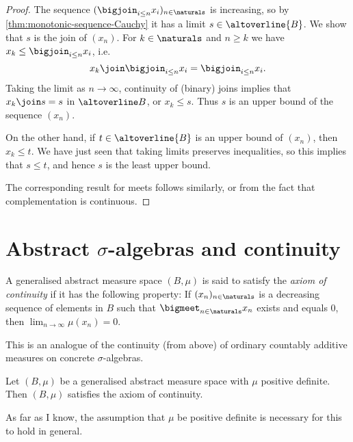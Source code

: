 \documentclass[article, a4paper, 11pt, oneside]{memoir}
\numberwithin{equation}{chapter}
\begin{document}
\begin{proof}
    The sequence $( \bigjoin_{i \leq n} x_i )_{n\in\naturals}$ is increasing, so by \cref{thm:monotonic-sequence-Cauchy} it has a limit $s \in \altoverline{B}$. We show that $s$ is the join of $(x_n)$. For $k \in \naturals$ and $n \geq k$ we have $x_k \leq \bigjoin_{i \leq n} x_i$, i.e.
    \begin{equation*}
        x_k \join \bigjoin_{i \leq n} x_i
            = \bigjoin_{i \leq n} x_i.
    \end{equation*}
    Taking the limit as $n \to \infty$, continuity of (binary) joins implies that $x_k \join s = s$ in $\altoverline B$, or $x_k \leq s$. Thus $s$ is an upper bound of the sequence $(x_n)$.

    On the other hand, if $t \in \altoverline{B}$ is an upper bound of $(x_n)$, then $x_k \leq t$. We have just seen that taking limits preserves inequalities, so this implies that $s \leq t$, and hence $s$ is the least upper bound.

    The corresponding result for meets follows similarly, or from the fact that complementation is continuous.
\end{proof}


\section[Abstract sigma-algebras and continuity][Abstract $\sigma$-algebras and continuity]{Abstract $\sigma$-algebras and continuity}

\begin{definition}
    A generalised abstract measure space $(B, \mu)$ is said to satisfy the \emph{axiom of continuity} if it has the following property: If $(x_n)_{n\in\naturals}$ is a decreasing sequence of elements in $B$ such that $\bigmeet_{n\in\naturals} x_n$ exists and equals $0$, then $\lim_{n\to\infty} \mu(x_n) = 0$.
\end{definition}
%
This is an analogue of the continuity (from above) of ordinary countably additive measures on concrete $\sigma$-algebras.


\begin{lemma}
    \label{thm:positive-definite-implies-continuous}
    Let $(B, \mu)$ be a generalised abstract measure space with $\mu$ positive definite. Then $(B,\mu)$ satisfies the axiom of continuity.
\end{lemma}
%
As far as I know, the assumption that $\mu$ be positive definite is necessary for this to hold in general.
\end{document}
